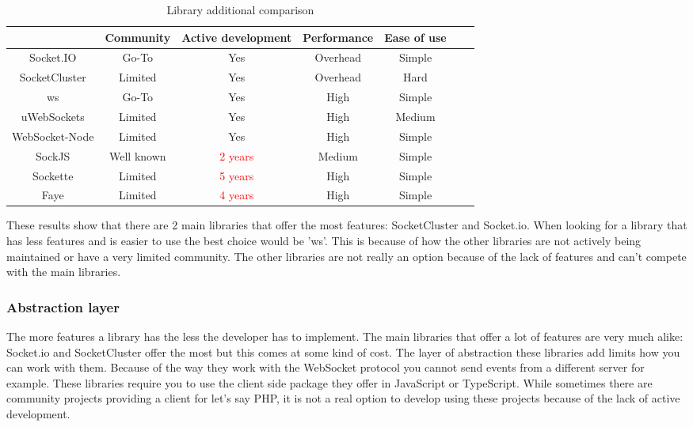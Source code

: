 \begin{table}[h]
  \centering
  \begin{tabular}{|c|c|c|c|c|c|c|}
    \hline
                   & Community  & Active development       & Performance & Ease of use \\ \hline
    Socket.IO      & Go-To      & Yes                      & Overhead    & Simple      \\ \hline
    SocketCluster  & Limited    & Yes                      & Overhead    & Hard        \\ \hline
    ws             & Go-To      & Yes                      & High        & Simple      \\ \hline
    uWebSockets    & Limited    & Yes                      & High        & Medium      \\ \hline
    WebSocket-Node & Limited    & Yes                      & High        & Simple      \\ \hline
    SockJS         & Well known & \textcolor{red}{2 years} & Medium      & Simple      \\ \hline
    Sockette       & Limited    & \textcolor{red}{5 years} & High        & Simple      \\ \hline
    Faye           & Limited    & \textcolor{red}{4 years} & High        & Simple      \\ \hline
  \end{tabular}
  \caption{Library additional comparison}
\end{table}

These results show that there are 2 main libraries that offer the most features: SocketCluster and Socket.io. When looking for a library that has less features and is easier to use the best choice would be 'ws'. This is because of how the other libraries are not actively being maintained or have a very limited community. The other libraries are not really an option because of the lack of features and can't compete with the main libraries.

\subsubsection{Abstraction layer}

The more features a library has the less the developer has to implement. The main libraries that offer a lot of features are very much alike: Socket.io and SocketCluster offer the most but this comes at some kind of cost. The layer of abstraction these libraries add limits how you can work with them. Because of the way they work with the WebSocket protocol you cannot send events from a different server for example. These libraries require you to use the client side package they offer in JavaScript or TypeScript. While sometimes there are community projects providing a client for let's say PHP, it is not a real option to develop using these projects because of the lack of active development.

